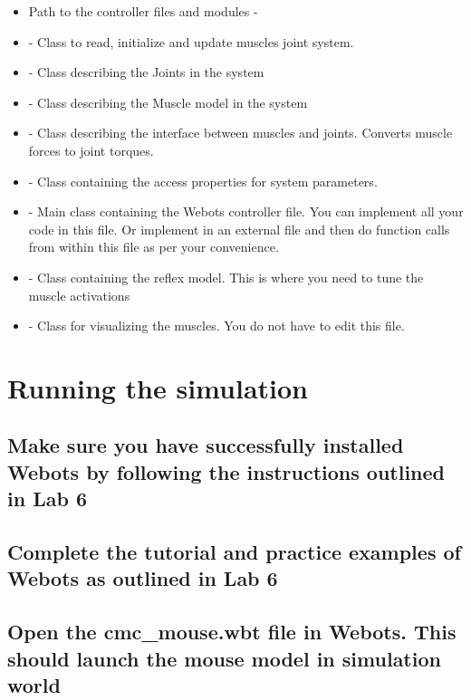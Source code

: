 \documentclass{cmc}
\begin{document}
\begin{itemize}
\item Path to the controller files and modules -
\item {} - Class to
  read, initialize and update muscles joint system.
\item {} - Class describing the Joints
  in the system
\item {} - Class describing the Muscle
  model in the system
\item {} - Class describing the
  interface between muscles and joints.  Converts muscle forces to
  joint torques.
\item {} - Class containing
  the access properties for system parameters.
\item {} - Main class containing the Webots controller
  file. You can implement all your code in this file. Or implement in
  an external file and then do function calls from within this file as
  per your convenience.
\item {} - Class containing the reflex model.  This is
  where you need to tune the muscle activations
\item {} - Class for visualizing the
  muscles.  You do not have to edit this file.
\end{itemize}


\newpage
\section*{Running the simulation}

\subsection*{Make sure you have successfully installed Webots by
  following the instructions outlined in Lab 6}

\subsection*{Complete the tutorial and practice examples of Webots as
  outlined in Lab 6}

\subsection*{Open the cmc\_mouse.wbt file in Webots. This should
  launch the mouse model in simulation world}
\end{document}
